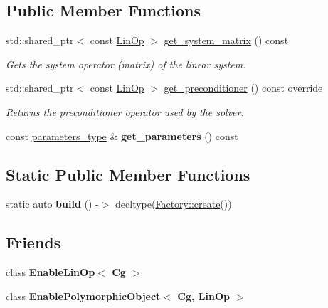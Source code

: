 \subsection*{Public Member Functions}
\begin{DoxyCompactItemize}
\item 
std\+::shared\+\_\+ptr$<$ const \hyperlink{classgko_1_1LinOp}{Lin\+Op} $>$ \hyperlink{classgko_1_1solver_1_1Cg_a09d50a99fdc668316757ee253386ad2a}{get\+\_\+system\+\_\+matrix} () const
\begin{DoxyCompactList}\small\item\em Gets the system operator (matrix) of the linear system. \end{DoxyCompactList}\item 
std\+::shared\+\_\+ptr$<$ const \hyperlink{classgko_1_1LinOp}{Lin\+Op} $>$ \hyperlink{classgko_1_1solver_1_1Cg_a797544ecc8d86d2798014e7f5f5baf4f}{get\+\_\+preconditioner} () const override
\begin{DoxyCompactList}\small\item\em Returns the preconditioner operator used by the solver. \end{DoxyCompactList}\item 
\mbox{\label{classgko_1_1solver_1_1Cg_a548b5ff27c59e50f78eb96a0463453ae}} 
const \hyperlink{structgko_1_1solver_1_1Cg_1_1parameters__type}{parameters\+\_\+type} \& {\bfseries get\+\_\+parameters} () const
\end{DoxyCompactItemize}
\subsection*{Static Public Member Functions}
\begin{DoxyCompactItemize}
\item 
\mbox{\label{classgko_1_1solver_1_1Cg_a90f6d967a604a168145da646f17b6fc3}} 
static auto {\bfseries build} () -\/$>$ decltype(\hyperlink{classgko_1_1EnableDefaultFactory_a1d077101d9e788e6c65f088612d14cc3}{Factory\+::create}())
\end{DoxyCompactItemize}
\subsection*{Friends}
\begin{DoxyCompactItemize}
\item 
\mbox{\label{classgko_1_1solver_1_1Cg_addd5cadb50dadd7e118776aeee9eb1c4}} 
class {\bfseries Enable\+Lin\+Op$<$ Cg $>$}
\item 
\mbox{\label{classgko_1_1solver_1_1Cg_a4a8963db94d0c3f4136daf08823c6b09}} 
class {\bfseries Enable\+Polymorphic\+Object$<$ Cg, Lin\+Op $>$}
\end{DoxyCompactItemize}


